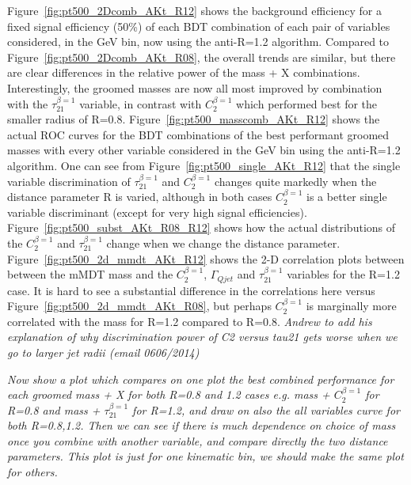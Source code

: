 Figure~\ref{fig:pt500_2Dcomb_AKt_R12} shows the background efficiency
for a fixed signal efficiency (50\%) of each BDT combination of
each pair of variables considered, in the  GeV bin, now using the anti-\kT R=1.2
algorithm. Compared to Figure~\ref{fig:pt500_2Dcomb_AKt_R08}, the
overall trends are similar, but there are clear differences in the
relative power of the mass + X combinations. Interestingly, the groomed masses are now all most improved by combination
with the $\tau_{21}^{\beta=1}$ variable, in contrast with
$C_{2}^{\beta=1}$ which performed best for the smaller radius of
R=0.8. 
Figure~\ref{fig:pt500_masscomb_AKt_R12} shows the actual ROC curves
for the BDT combinations of
the best performant groomed masses with every other
variable considered in the  GeV bin using the anti-\kT R=1.2
algorithm. 
One can see from Figure~\ref{fig:pt500_single_AKt_R12} that the
single variable discrimination of $\tau_{21}^{\beta=1}$ and
$C_{2}^{\beta=1}$ changes quite markedly when the distance parameter R
is varied, although in both cases $C_{2}^{\beta=1}$ is a better single
variable discriminant (except for very high signal
efficiencies). Figure~\ref{fig:pt500_subst_AKt_R08_R12} shows how the
actual distributions of the $C_{2}^{\beta=1}$ and $\tau_{21}^{\beta=1}$
change when we change the distance parameter. Figure~\ref{fig:pt500_2d_mmdt_AKt_R12} shows the 2-D
correlation plots between between the mMDT mass and the $C_{2}^{\beta=1}$,
$\Gamma_{Qjet}$ and $\tau_{21}^{\beta=1}$ variables for the R=1.2
case. It is hard to see a substantial difference in the correlations
here versus Figure~\ref{fig:pt500_2d_mmdt_AKt_R08}, but perhaps
$C_{2}^{\beta=1}$ is marginally more correlated with the mass for
R=1.2 compared to R=0.8.
{\it Andrew to add his explanation of why discrimination power of C2 versus tau21
  gets worse when we go to larger jet radii (email 0606/2014)}


{\it Now show a plot which compares on one plot the best combined performance for
each groomed mass + X for both R=0.8 and 1.2 cases e.g. mass +
$C_{2}^{\beta=1}$ for R=0.8 and mass + $\tau_{21}^{\beta=1}$ for R=1.2,
  and draw on also the
all variables curve for both R=0.8,1.2. 
Then we can see if there is much dependence on choice of mass once you
combine with another variable, and compare directly the two distance parameters.
This plot is just for
one kinematic bin, we should make the same plot for others.}

